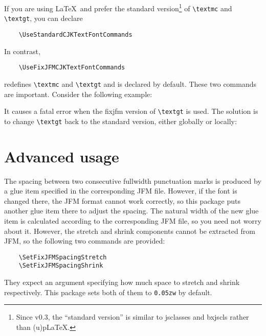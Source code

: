 \documentclass[a4paper]{article}
\newcommand\NormalSans{\normalfont\sffamily}
\newcommand\pkg[1]{{\protect\NormalSans#1}}
\newcommand\pLaTeX{p\LaTeX}
\newcommand\FwBox{\ensuremath{\square}\hskip0em plus 0.05em\relax}
\newcommand\TwoFwBoxes{\FwBox\FwBox}
\begin{document}
If you are using \LaTeX\ and prefer the standard version\footnote{Since v0.3,
the ``standard version'' is similar to \pkg{jsclasses} and \pkg{bxjscls} rather
than (u)\pLaTeX.} of \verb|\textmc| and \verb|\textgt|, you can declare
\begin{verbatim}
    \UseStandardCJKTextFontCommands
\end{verbatim}
In contrast,
\begin{verbatim}
    \UseFixJFMCJKTextFontCommands
\end{verbatim}
redefines \verb|\textmc| and \verb|\textgt| and is declared by default. These
two commands are important. Consider the following example:
\begin{trivlist}
\item\relax{\ttfamily\hskip2em}\verb|\textgt{\Large |\TwoFwBoxes\verb|}|
\end{trivlist}
It causes a fatal error when the \pkg{fixjfm} version of \verb|\textgt| is used.
The solution is to change \verb|\textgt| back to the standard version, either
globally or locally:
\begin{trivlist}\itemsep=0pt\relax\parsep=0pt\relax
\item\relax{\ttfamily\hskip2em}%
\verb|\UseFixJFMCJKTextFontCommands   \textgt{|\TwoFwBoxes\verb|}|
\item\relax{\ttfamily\hskip2em}%
\verb|\UseStandardCJKTextFontCommands \textgt{\Large |\TwoFwBoxes\verb|}|
\item\relax{\ttfamily\hskip2em}%
\verb|\UseFixJFMCJKTextFontCommands   \textgt{|\TwoFwBoxes\verb|}|
\item\relax{\ttfamily\hskip1.5em}%
\verb|{\UseStandardCJKTextFontCommands \textgt{\Large |\TwoFwBoxes\verb|}}|
\end{trivlist}

\section{Advanced usage}

The spacing between two consecutive fullwidth punctuation marks is produced by
a glue item specified in the corresponding JFM file. However, if the font is
changed there, the JFM format cannot work correctly, so this package puts
another glue item there to adjust the spacing. The natural width of the new glue
item is calculated according to the corresponding JFM file, so you need not
worry about it. However, the stretch and shrink components cannot be extracted
from JFM, so the following two commands are provided:
\begin{verbatim}
    \SetFixJFMSpacingStretch
    \SetFixJFMSpacingShrink
\end{verbatim}
They expect an argument specifying how much space to stretch and shrink
respectively. This package sets both of them to \verb|0.05zw| by default.
\end{document}
